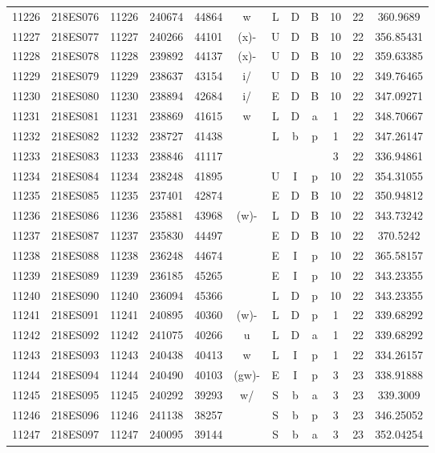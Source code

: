 \begin{tabular}{|*{12}{c|}}
11226 & 218ES076 & 11226 & 240674 & 44864 & w & L & D & B & 10 & 22 & 360.9689 \\ 
11227 & 218ES077 & 11227 & 240266 & 44101 & (x)- & U & D & B & 10 & 22 & 356.85431 \\ 
11228 & 218ES078 & 11228 & 239892 & 44137 & (x)- & U & D & B & 10 & 22 & 359.63385 \\ 
11229 & 218ES079 & 11229 & 238637 & 43154 & i/ & U & D & B & 10 & 22 & 349.76465 \\ 
11230 & 218ES080 & 11230 & 238894 & 42684 & i/ & E & D & B & 10 & 22 & 347.09271 \\ 
11231 & 218ES081 & 11231 & 238869 & 41615 & w & L & D & a & 1 & 22 & 348.70667 \\ 
11232 & 218ES082 & 11232 & 238727 & 41438 &  & L & b & p & 1 & 22 & 347.26147 \\ 
11233 & 218ES083 & 11233 & 238846 & 41117 &  &  &  &  & 3 & 22 & 336.94861 \\ 
11234 & 218ES084 & 11234 & 238248 & 41895 &  & U & I & p & 10 & 22 & 354.31055 \\ 
11235 & 218ES085 & 11235 & 237401 & 42874 &  & E & D & B & 10 & 22 & 350.94812 \\ 
11236 & 218ES086 & 11236 & 235881 & 43968 & (w)- & L & D & B & 10 & 22 & 343.73242 \\ 
11237 & 218ES087 & 11237 & 235830 & 44497 &  & E & D & B & 10 & 22 & 370.5242 \\ 
11238 & 218ES088 & 11238 & 236248 & 44674 &  & E & I & p & 10 & 22 & 365.58157 \\ 
11239 & 218ES089 & 11239 & 236185 & 45265 &  & E & I & p & 10 & 22 & 343.23355 \\ 
11240 & 218ES090 & 11240 & 236094 & 45366 &  & L & D & p & 10 & 22 & 343.23355 \\ 
11241 & 218ES091 & 11241 & 240895 & 40360 & (w)- & L & D & p & 1 & 22 & 339.68292 \\ 
11242 & 218ES092 & 11242 & 241075 & 40266 & u & L & D & a & 1 & 22 & 339.68292 \\ 
11243 & 218ES093 & 11243 & 240438 & 40413 & w & L & I & p & 1 & 22 & 334.26157 \\ 
11244 & 218ES094 & 11244 & 240490 & 40103 & (gw)- & E & I & p & 3 & 23 & 338.91888 \\ 
11245 & 218ES095 & 11245 & 240292 & 39293 & w/ & S & b & a & 3 & 23 & 339.3009 \\ 
11246 & 218ES096 & 11246 & 241138 & 38257 &  & S & b & p & 3 & 23 & 346.25052 \\ 
11247 & 218ES097 & 11247 & 240095 & 39144 &  & S & b & a & 3 & 23 & 352.04254 \\ 

\end{tabular}

